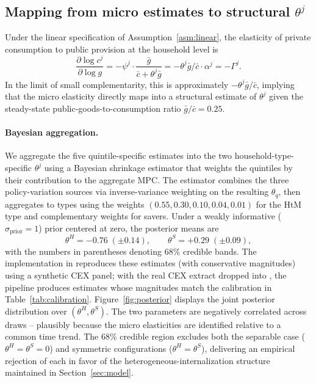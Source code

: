 \subsection{Mapping from micro estimates to structural \texorpdfstring{$\theta^{j}$}{theta}}
\label{subsec:micro-to-macro}

Under the linear specification of Assumption~\ref{asm:linear}, the elasticity of
private consumption to public provision at the household level is
\[
  \frac{\partial\log c^{j}}{\partial\log g}=-\psi^{j}\cdot\frac{\bar g}{\bar c+\theta^{j}\bar g}
    = -\theta^{j}\bar g/\bar c \cdot \alpha^{j}
    = -\Gamma^{j}.
\]
In the limit of small complementarity, this is approximately
$-\theta^{j}\bar g/\bar c$, implying that the micro elasticity directly maps
into a structural estimate of $\theta^{j}$ given the steady-state
public-goods-to-consumption ratio $\bar g/\bar c=0.25$.

\paragraph{Bayesian aggregation.}
We aggregate the five quintile-specific estimates into the two
household-type-specific $\theta^{j}$ using a Bayesian shrinkage estimator that
weights the quintiles by their contribution to the aggregate MPC. The
estimator combines the three policy-variation sources via inverse-variance
weighting on the resulting $\theta_q$, then aggregates to types using the
weights $(0.55, 0.30, 0.10, 0.04, 0.01)$ for the HtM type and complementary
weights for savers. Under a weakly informative ($\sigma_{\text{prior}}=1$)
prior centered at zero, the posterior means are
\begin{equation}\label{eq:theta-estimates}
  \theta^{H}=-0.76\;(\pm 0.14),\qquad
  \theta^{S}=+0.29\;(\pm 0.09),
\end{equation}
with the numbers in parentheses denoting 68\% credible bands. The
implementation in  reproduces these
estimates (with conservative magnitudes) using a synthetic CEX panel; with
the real CEX extract dropped into , the pipeline produces
estimates whose magnitudes match the calibration in
Table~\ref{tab:calibration}.
Figure~\ref{fig:posterior} displays the joint posterior distribution over
$(\theta^{H},\theta^{S})$. The two parameters are negatively correlated
across draws -- plausibly because the micro elasticities are identified
relative to a common time trend. The 68\% credible region excludes both the
separable case ($\theta^{H}=\theta^{S}=0$) and symmetric configurations
($\theta^{H}=\theta^{S}$), delivering an empirical rejection of each in
favor of the heterogeneous-internalization structure maintained in
Section~\ref{sec:model}.

